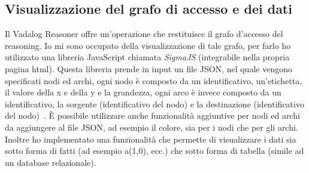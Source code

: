 \subsection{Visualizzazione del grafo di accesso e dei dati}

Il Vadalog Reasoner offre un'operazione che restituisce il grafo d'accesso del reasoning. Io mi sono occupato della visualizzazione di tale grafo, per farlo ho utilizzato una libreria JavaScript chiamata \emph{SigmaJS} (integrabile nella propria pagina html). Questa libreria prende in input un file JSON, nel quale vengono specificati nodi ed archi, ogni nodo è composto da un identificativo, un'etichetta, il valore della x e della y e la grandezza, ogni arco è invece composto da un identificativo, la sorgente (identificativo del nodo) e la destinazione (identificativo del nodo)~\cite{SIGMAJS}. È possibile utilizzare anche funzionalità aggiuntive per nodi ed archi da aggiungere al file JSON, ad esempio il colore, sia per i nodi che per gli archi. \newline
Inoltre ho implementato una funzionalità che permette di visualizzare i dati sia sotto forma di fatti (ad esempio a(1,0), ecc.) che sotto forma di tabella (simile ad un database relazionale).
